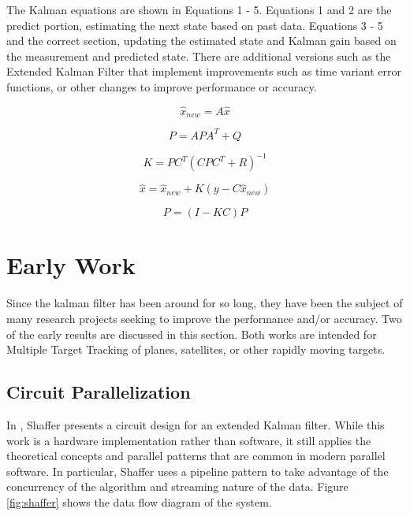 \documentclass[11pt]{article}
\begin{document}
The Kalman equations are shown in Equations 1 - 5. Equations 1 and 2 are the predict portion, estimating the next state based on past data. Equations 3 - 5 and the correct section, updating the estimated state and Kalman gain based on the measurement and predicted state. There are additional versions such as the Extended Kalman Filter that implement improvements such as time variant error functions, or other changes to improve performance or accuracy.

\begin{equation}
\hat{x}_{new} = A\hat{x}
\end{equation}

\begin{equation}
P=APA^T+Q
\end{equation}

\begin{equation}
K = PC^T(CPC^T+R)^{-1}
\end{equation}

\begin{equation}
\hat{x}=\hat{x}_{new} + K(y-C\hat{x}_{new})
\end{equation}

\begin{equation}
P=(I-KC)P
\end{equation}

\section{Early Work}
Since the kalman filter has been around for so long, they have been the subject of many research projects seeking to improve the performance and/or accuracy. Two of the early results are discussed in this section. Both works are intended for Multiple Target Tracking of planes, satellites, or other rapidly moving targets.

\subsection{Circuit Parallelization}
In \cite{Shaffer:1987:IPE:42040.42101}, Shaffer presents a circuit design for an extended Kalman filter. While this work is a hardware implementation rather than software, it still applies the theoretical concepts and parallel patterns that are common in modern parallel software. In particular, Shaffer uses a pipeline pattern to take advantage of the concurrency of the algorithm and streaming nature of the data. Figure \ref{fig:shaffer} shows the data flow diagram of the system.
\end{document}
